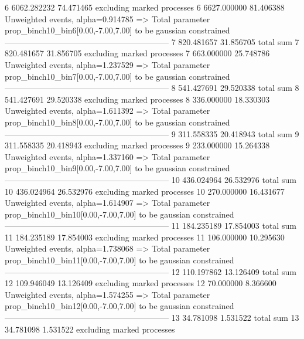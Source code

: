 6          6062.282232     74.471465       excluding marked processes    
6          6627.000000     81.406388       Unweighted events, alpha=0.914785
  => Total parameter prop_binch10_bin6[0.00,-7.00,7.00] to be gaussian constrained
------------------------------------------------------------
7          820.481657      31.856705       total sum                     
7          820.481657      31.856705       excluding marked processes    
7          663.000000      25.748786       Unweighted events, alpha=1.237529
  => Total parameter prop_binch10_bin7[0.00,-7.00,7.00] to be gaussian constrained
------------------------------------------------------------
8          541.427691      29.520338       total sum                     
8          541.427691      29.520338       excluding marked processes    
8          336.000000      18.330303       Unweighted events, alpha=1.611392
  => Total parameter prop_binch10_bin8[0.00,-7.00,7.00] to be gaussian constrained
------------------------------------------------------------
9          311.558335      20.418943       total sum                     
9          311.558335      20.418943       excluding marked processes    
9          233.000000      15.264338       Unweighted events, alpha=1.337160
  => Total parameter prop_binch10_bin9[0.00,-7.00,7.00] to be gaussian constrained
------------------------------------------------------------
10         436.024964      26.532976       total sum                     
10         436.024964      26.532976       excluding marked processes    
10         270.000000      16.431677       Unweighted events, alpha=1.614907
  => Total parameter prop_binch10_bin10[0.00,-7.00,7.00] to be gaussian constrained
------------------------------------------------------------
11         184.235189      17.854003       total sum                     
11         184.235189      17.854003       excluding marked processes    
11         106.000000      10.295630       Unweighted events, alpha=1.738068
  => Total parameter prop_binch10_bin11[0.00,-7.00,7.00] to be gaussian constrained
------------------------------------------------------------
12         110.197862      13.126409       total sum                     
12         109.946049      13.126409       excluding marked processes    
12         70.000000       8.366600        Unweighted events, alpha=1.574255
  => Total parameter prop_binch10_bin12[0.00,-7.00,7.00] to be gaussian constrained
------------------------------------------------------------
13         34.781098       1.531522        total sum                     
13         34.781098       1.531522        excluding marked processes    
